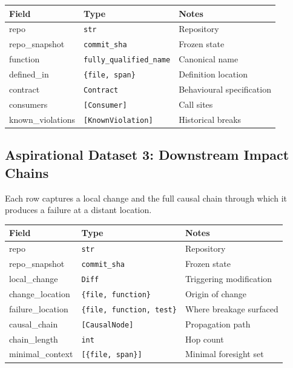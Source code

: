 \documentclass[a4paper,12pt]{article}
\begin{document}
\begin{tcolorbox}[title=Function]
\footnotesize
\begin{tabularx}{\linewidth}{@{} l l Y @{}}
\toprule
\textbf{Field} & \textbf{Type} & \textbf{Notes} \\
\midrule
repo & \texttt{str} & Repository \\
repo\_snapshot & \texttt{commit\_sha} & Frozen state \\
function & \texttt{fully\_qualified\_name} & Canonical name \\
defined\_in & \texttt{\{file, span\}} & Definition location \\
contract & \texttt{Contract} & Behavioural specification \\
consumers & \texttt{[Consumer]} & Call sites \\
known\_violations & \texttt{[KnownViolation]} & Historical breaks \\
\bottomrule
\end{tabularx}
\end{tcolorbox}

\subsection*{Aspirational Dataset 3: Downstream Impact Chains}

\noindent Each row captures a local change and the full causal chain through which it produces a failure at a distant location.

\begin{tcolorbox}[title=ChangeImpact]
\footnotesize
\begin{tabularx}{\linewidth}{@{} l l Y @{}}
\toprule
\textbf{Field} & \textbf{Type} & \textbf{Notes} \\
\midrule
repo & \texttt{str} & Repository \\
repo\_snapshot & \texttt{commit\_sha} & Frozen state \\
local\_change & \texttt{Diff} & Triggering modification \\
change\_location & \texttt{\{file, function\}} & Origin of change \\
failure\_location & \texttt{\{file, function, test\}} & Where breakage surfaced \\
causal\_chain & \texttt{[CausalNode]} & Propagation path \\
chain\_length & \texttt{int} & Hop count \\
minimal\_context & \texttt{[\{file, span\}]} & Minimal foresight set \\
\bottomrule
\end{tabularx}
\end{tcolorbox}
\end{document}
